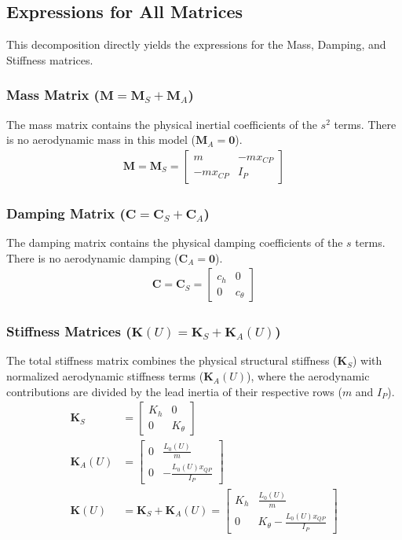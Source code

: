 \documentclass{article}
\begin{document}
\subsection{Expressions for All Matrices}
This decomposition directly yields the expressions for the Mass, Damping, and Stiffness matrices.

\subsubsection{Mass Matrix ($\mathbf{M} = \mathbf{M}_S + \mathbf{M}_A$)}
The mass matrix contains the physical inertial coefficients of the $s^2$ terms. There is no aerodynamic mass in this model ($\mathbf{M}_A = \mathbf{0}$).
\begin{align}
    \mathbf{M} = \mathbf{M}_S = \begin{bmatrix} m & -mx_{CP} \\ -mx_{CP} & I_P \end{bmatrix}
\end{align}

\subsubsection{Damping Matrix ($\mathbf{C} = \mathbf{C}_S + \mathbf{C}_A$)}
The damping matrix contains the physical damping coefficients of the $s$ terms. There is no aerodynamic damping ($\mathbf{C}_A = \mathbf{0}$).
\begin{align}
    \mathbf{C} = \mathbf{C}_S = \begin{bmatrix} c_h & 0 \\ 0 & c_\theta \end{bmatrix}
\end{align}

\subsubsection{Stiffness Matrices ($\mathbf{K}(U) = \mathbf{K}_S + \mathbf{K}_A(U)$)}
The total stiffness matrix combines the physical structural stiffness ($\mathbf{K}_S$) with normalized aerodynamic stiffness terms ($\mathbf{K}_A(U)$), where the aerodynamic contributions are divided by the lead inertia of their respective rows ($m$ and $I_P$).
\begin{align}
    \mathbf{K}_S &= \begin{bmatrix} K_h & 0 \\ 0 & K_\theta \end{bmatrix} \\
    \mathbf{K}_A(U) &= \begin{bmatrix} 0 & \frac{L_0(U)}{m} \\ 0 & -\frac{L_0(U)x_{QP}}{I_P} \end{bmatrix} \\
    \mathbf{K}(U) &= \mathbf{K}_S + \mathbf{K}_A(U) = \begin{bmatrix} K_h & \frac{L_0(U)}{m} \\ 0 & K_\theta - \frac{L_0(U)x_{QP}}{I_P} \end{bmatrix}
\end{align}
\end{document}
